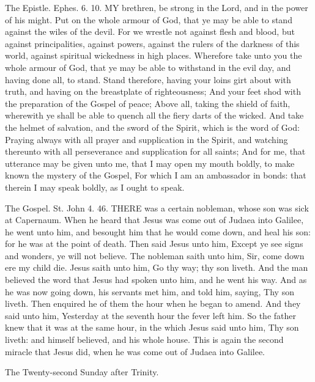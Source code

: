 The Epistle. Ephes. 6. 10.
MY brethren, be strong in the Lord, and in the power of his might. Put on the whole armour of God, that ye may be able to stand against the wiles of the devil. For we wrestle not against flesh and blood, but against principalities, against powers, against the rulers of the darkness of this world, against spiritual wickedness in high places. Wherefore take unto you the whole armour of God, that ye may be able to withstand in the evil day, and having done all, to stand. Stand therefore, having your loins girt about with truth, and having on the breastplate of righteousness; And your feet shod with the preparation of the Gospel of peace; Above all, taking the shield of faith, wherewith ye shall be able to quench all the fiery darts of the wicked. And take the helmet of salvation, and the sword of the Spirit, which is the word of God: Praying always with all prayer and supplication in the Spirit, and watching thereunto with all perseverance and supplication for all saints; And for me, that utterance may be given unto me, that I may open my mouth boldly, to make known the mystery of the Gospel, For which I am an ambassador in bonds: that therein I may speak boldly, as I ought to speak.


The Gospel. St. John 4. 46.
THERE was a certain nobleman, whose son was sick at Capernaum. When he heard that Jesus was come out of Judaea into Galilee, he went unto him, and besought him that he would come down, and heal his son: for he was at the point of death. Then said Jesus unto him, Except ye see signs and wonders, ye will not believe. The nobleman saith unto him, Sir, come down ere my child die. Jesus saith unto him, Go thy way; thy son liveth. And the man believed the word that Jesus had spoken unto him, and he went his way. And as he was now going down, his servants met him, and told him, saying, Thy son liveth. Then enquired he of them the hour when he began to amend. And they said unto him, Yesterday at the seventh hour the fever left him. So the father knew that it was at the same hour, in the which Jesus said unto him, Thy son liveth: and himself believed, and his whole house. This is again the second miracle that Jesus did, when he was come out of Judaea into Galilee.


The Twenty-second Sunday after Trinity.
\subsection{}


